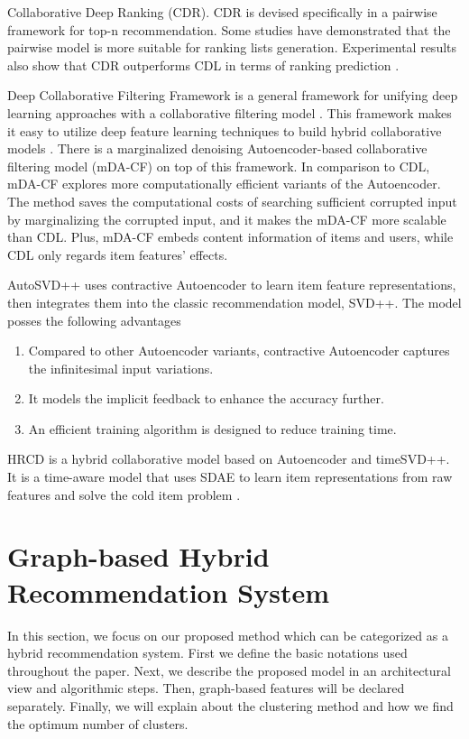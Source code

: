 \documentclass[a4paper,fleqn]{cas-dc}
\begin{document}
Collaborative Deep Ranking (CDR). CDR \citep{38ying2016a} is devised specifically in a pairwise framework for top-n recommendation. Some studies have demonstrated that the pairwise model is more suitable for ranking lists generation. Experimental results also show that CDR outperforms CDL in terms of ranking prediction \citep{29zhang2019a}.

Deep Collaborative Filtering Framework is a general framework for unifying deep learning approaches with a collaborative filtering model \citep{39li2015a}. This framework makes it easy to utilize deep feature learning techniques to build hybrid collaborative models \citep{29zhang2019a}. There is a marginalized denoising Autoencoder-based collaborative filtering model (mDA-CF) on top of this framework. In comparison to CDL, mDA-CF explores more computationally efficient variants of the Autoencoder. The method saves the computational costs of searching sufficient corrupted input by marginalizing the corrupted input, and it makes the mDA-CF more scalable than CDL. Plus, mDA-CF embeds content information of items and users, while CDL only regards item features' effects.

AutoSVD++ \citep{40zhang2017a} uses contractive Autoencoder \citep{41rifai2011a} to learn item feature representations, then integrates them into the classic recommendation model, SVD++. The model posses the following advantages \citep{29zhang2019a}
\begin{enumerate}
	\item Compared to other Autoencoder variants, contractive Autoencoder captures the infinitesimal input variations.
	\item It models the implicit feedback to enhance the accuracy further.
	\item An efficient training algorithm is designed to reduce training time.
\end{enumerate}

HRCD \citep{42wei2017a} is a hybrid collaborative model based on Autoencoder and timeSVD++. It is a time-aware model that uses SDAE to learn item representations from raw features and solve the cold item problem \citep{29zhang2019a}.

\section{Graph-based Hybrid Recommendation System}
\label{ghrs}
In this section, we focus on our proposed method which can be categorized as a hybrid recommendation system. First we define the basic notations used throughout the paper. Next, we describe the proposed model in an architectural view and algorithmic steps. Then, graph-based features will be declared separately. Finally, we will explain about the clustering method and how we find the optimum number of clusters.
\end{document}
